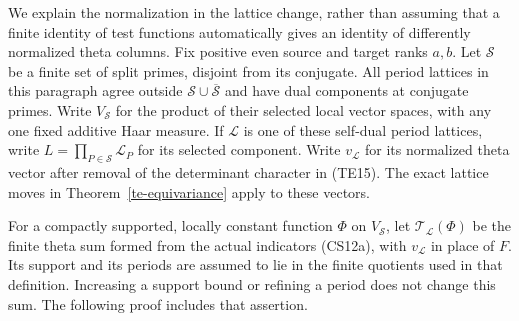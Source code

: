 We explain the normalization in the lattice change, rather than
assuming that a finite identity of test functions automatically gives
an identity of differently normalized theta columns.
Fix positive even source and target ranks $a,b$.
Let $\mathcal S$ be a finite set of split primes, disjoint from its
conjugate. All period lattices in this paragraph agree outside
$\mathcal S\cup\overline{\mathcal S}$ and have dual components at
conjugate primes. Write $V_{\mathcal S}$ for the product of their
selected local vector spaces, with any one fixed additive Haar measure.
If $\mathcal L$ is one of these self-dual period lattices, write
$L=\prod_{P\in\mathcal S}\mathcal L_P$ for its selected component.
Write $v_{\mathcal L}$ for its normalized theta vector after removal
of the determinant character in (TE15). The exact lattice moves in
Theorem~\ref{te-equivariance} apply to these vectors.

For a compactly supported, locally constant function $\Phi$ on
$V_{\mathcal S}$, let $\mathcal T_{\mathcal L}(\Phi)$ be the finite
theta sum formed from the actual indicators (CS12a), with
$v_{\mathcal L}$ in place of $F$. Its support and its periods are
assumed to lie in the finite quotients used in that definition.
Increasing a support bound or refining a period does not change
this sum. The following proof includes that assertion.

